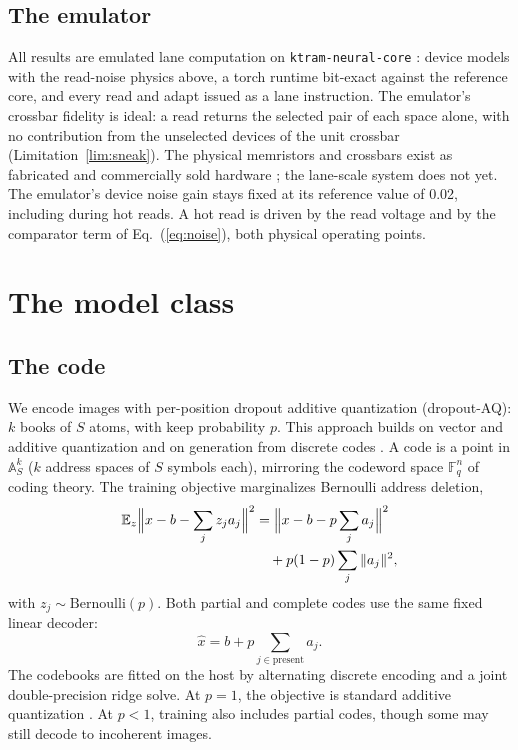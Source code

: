 \documentclass[reprint,amsmath,amssymb,aps,nofootinbib]{revtex4-2}
\newcommand{\A}{\mathbb{A}}
\begin{document}
\subsection{The emulator}\label{sec:emulator}

All results are emulated lane computation on
\texttt{ktram-neural-core} \cite{knowm2026emulator}: device models
with the read-noise physics above, a torch runtime bit-exact against
the reference core, and every read and adapt issued as a lane
instruction. The emulator's crossbar fidelity is ideal: a read returns
the selected pair of each space alone, with no contribution from the
unselected devices of the unit crossbar
(Limitation~\ref{lim:sneak}). The physical memristors and crossbars
exist as fabricated and commercially sold hardware
\cite{knowm2026datasheet}; the lane-scale system does not yet. The emulator's device noise gain stays fixed at its reference value of
0.02, including during hot reads. A hot read is driven by the read voltage
and by the comparator term of Eq.~(\ref{eq:noise}), both physical
operating points.

\section{The model class}\label{sec:model}

\subsection{The code}\label{sec:code}

We encode images with per-position dropout additive quantization
(dropout-AQ): $k$ books of $S$ atoms, with keep probability $p$. This
approach builds on vector and additive quantization
\cite{gray1984vq,jegou2011product,babenko2014additive} and on generation
from discrete codes \cite{vandenoord2017vqvae,chang2022maskgit}. A code is a point in
$\A_S^k$ ($k$ address spaces of $S$ symbols each), mirroring the
codeword space $\mathbb{F}_q^n$ of coding theory. The training
objective marginalizes Bernoulli address deletion,
\begin{align}
\mathbb{E}_z \Bigl\| x - b - \sum_j z_j a_j \Bigr\|^2
&= \Bigl\| x - b - p \sum_j a_j \Bigr\|^2 \nonumber \\
&\quad + p(1-p) \sum_j \| a_j \|^2,
\label{eq:dropoutaq}
\end{align}
with $z_j \sim \mathrm{Bernoulli}(p)$. Both partial and complete codes
use the same fixed linear decoder:
\begin{equation}
\hat{x} = b + p \sum_{j \in \mathrm{present}} a_j .
\label{eq:decode}
\end{equation}
The codebooks are fitted on the host by alternating discrete encoding
and a joint double-precision ridge solve. At $p=1$, the objective is standard additive quantization
\cite{babenko2014additive}. At $p<1$, training also includes partial
codes, though some may still decode to incoherent images.
\end{document}

